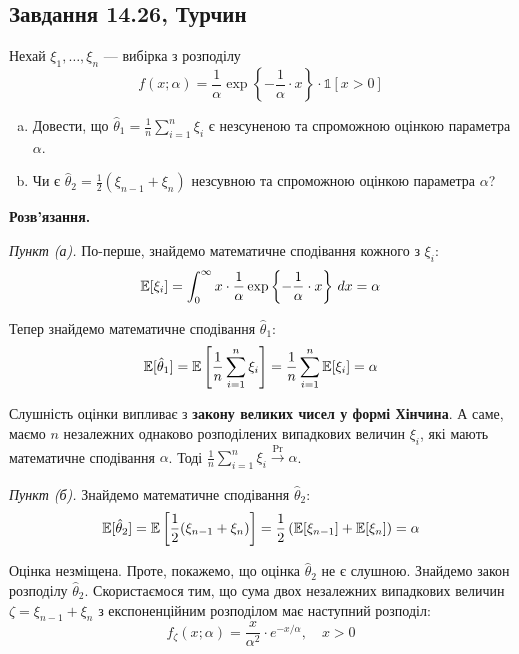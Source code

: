 \documentclass{hw_template}
\begin{document}
\subsection{Завдання 14.26, Турчин}

\begin{problem}
    Нехай $\xi_1,\dots,\xi_n$ --- вибірка з розподілу
    \begin{equation*}
        f(x;\alpha) = \frac{1}{\alpha} \exp \left\{-\frac{1}{\alpha} \cdot x\right\} \cdot \mathds{1}[x > 0]
    \end{equation*}

    \begin{enumerate}[(a)]
        \item Довести, що $\hat{\theta}_1 = \frac{1}{n}\sum_{i=1}^n \xi_i$ є незсуненою та спроможною оцінкою параметра $\alpha$.
        \item Чи є $\hat{\theta}_2 = \frac{1}{2}(\xi_{n-1}+\xi_n)$ незсувною та спроможною оцінкою параметра $\alpha$?
    \end{enumerate}
\end{problem}

\textbf{Розв'язання.}

\textit{Пункт (а).} По-перше, знайдемо математичне сподівання кожного з $\xi_i$:
\begin{align*}
    \mathbb{E}[\xi_i] = \int_{0}^{\infty} x \cdot \frac{1}{\alpha} \exp\left\{-\frac{1}{\alpha} \cdot x\right\} \, dx = \alpha
\end{align*}

Тепер знайдемо математичне сподівання $\hat{\theta}_1$:
\begin{align*}
    \mathbb{E}[\hat{\theta}_1] = \mathbb{E}\left[\frac{1}{n}\sum_{i=1}^n \xi_i\right] = \frac{1}{n}\sum_{i=1}^n \mathbb{E}[\xi_i] = \alpha
\end{align*}

Слушність оцінки випливає з \textbf{закону великих чисел у формі Хінчина}. А саме, маємо $n$ незалежних однаково розподілених випадкових величин $\xi_i$, які мають математичне сподівання $\alpha$. Тоді $\frac{1}{n}\sum_{i=1}^n \xi_i \xrightarrow[]{\text{Pr}} \alpha$.

\textit{Пункт (б).} Знайдемо математичне сподівання $\hat{\theta}_2$:
\begin{align*}
    \mathbb{E}[\hat{\theta}_2] = \mathbb{E}\left[\frac{1}{2}(\xi_{n-1} + \xi_n)\right] = \frac{1}{2}\left(\mathbb{E}[\xi_{n-1}] + \mathbb{E}[\xi_n]\right) = \alpha
\end{align*}

Оцінка незміщена. Проте, покажемо, що оцінка $\hat{\theta}_2$ не є слушною. Знайдемо закон розподілу $\hat{\theta}_2$. Скористаємося тим, що сума двох незалежних випадкових величин $\zeta = \xi_{n-1}+\xi_n$ з експоненційним розподілом має наступний розподіл:
\begin{equation*}
    f_{\zeta}(x;\alpha) = \frac{x}{\alpha^2} \cdot e^{-x/\alpha}, \quad x > 0
\end{equation*}
\end{document}
